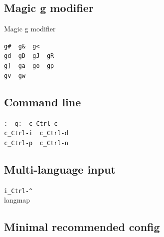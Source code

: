 \documentclass[14pt,svgnames,compress]{beamer}
\newcommand\hl[1]{\textcolor{HlColor}{#1}}
\newcommand\framesubtitlefontsize{\huge}
\newcommand\singleframesubtitle[1]{
    \begin{center}
        \framesubtitlefontsize #1
    \end{center}
}
\newcommand\subtitleframe{
    \begin{frame}
        \singleframesubtitle{\insertsubsectionhead}
    \end{frame}
}
\begin{document}
\subsection{Magic g modifier}

\begin{frame}
    \singleframesubtitle{Magic \hl{g} modifier}
\end{frame}

\begin{frame}[fragile]
    \begin{spacing}{1.5} %
        \Large
        \centering
        \verb|g#  g&  g<| \\ \medskip
        \verb|gd  gD  gJ  gR| \\ \medskip
        \verb|g]  ga  go  gp| \\ \medskip
        \verb|gv  gw| \\
    \end{spacing}
\end{frame}


\subsection{Command line}

\subtitleframe

\begin{frame}[fragile]
    \begin{spacing}{1.5} %
        \Large
        \centering
        \verb|:  q:  c_Ctrl-c| \\ \bigskip
        \verb|c_Ctrl-i  c_Ctrl-d| \\ \bigskip
        \verb|c_Ctrl-p  c_Ctrl-n|
    \end{spacing}
\end{frame}


\subsection{Multi-language input}

\subtitleframe

\begin{frame}[fragile]
    \Large
    \centering
    \verb|i_Ctrl-^| \\
    \vspace{1cm}
    \hl{langmap} \\
\end{frame}


\subsection{Minimal recommended config}
\end{document}
